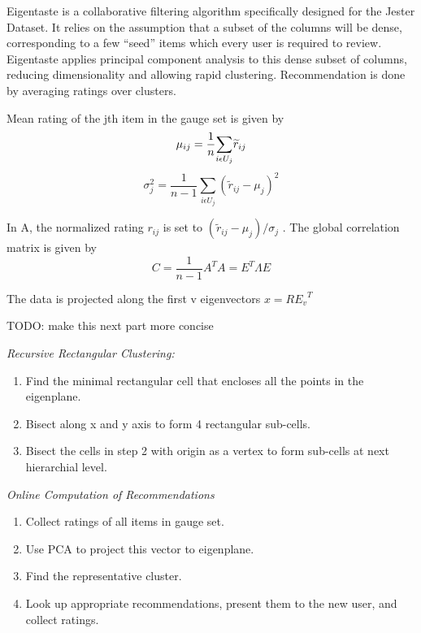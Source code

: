 \documentclass{article} %
\begin{document}
Eigentaste is a collaborative filtering algorithm specifically
designed for the Jester Dataset. It relies on the assumption that a
subset of the columns will be dense, corresponding to a few ``seed''
items which every user is required to review. Eigentaste applies
principal component analysis to this dense subset of columns, reducing
dimensionality and allowing rapid clustering. Recommendation is done
by averaging ratings over clusters.

Mean rating of the jth item in the gauge set is given by
\begin{equation*}
\mu_{ij}=\frac{1}{n}{\sum_{i\epsilon U_{j}}}\widetilde{r}_{ij}\\
\end{equation*}
\begin{equation*}
\sigma_j^2=\frac{1}{n-1}{\sum_{i\epsilon U_{j}}}({\widetilde{r}_{ij}-\mu_{j}})^{2}
\end{equation*}

In A, the normalized rating $r_{ij}$ is set to
$({\widetilde{r}_{ij}-\mu_{j}})/\sigma _{j}$ . The global correlation
matrix is given by
\begin{equation*}
C=\frac{1}{n-1}A^{T}A=E^{T} \Lambda E
\end{equation*}

The data is projected along the first v eigenvectors $x=R{E_{v}}^{T}$

TODO: make this next part more concise

\textit{Recursive Rectangular Clustering: }

\begin{enumerate}
\item Find the minimal rectangular cell that encloses all the points
  in the eigenplane.
\item Bisect along x and y axis to form 4 rectangular sub-cells.
\item Bisect the cells in step 2 with origin as a vertex to form
  sub-cells at next hierarchial level.
\end{enumerate}

 \textit{Online Computation of Recommendations}

\begin{enumerate}
\item Collect ratings of all items in gauge set.
\item Use PCA to project this vector to eigenplane.
\item Find the representative cluster.
\item Look up appropriate recommendations, present them to the new
  user, and collect ratings.
\end{enumerate}
\end{document}
